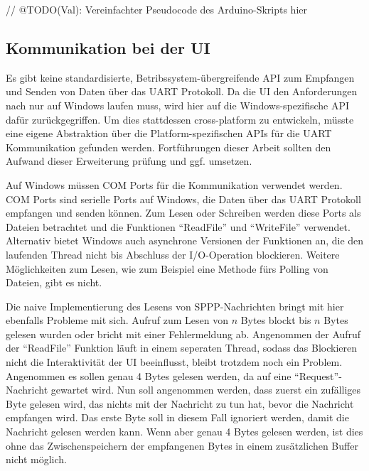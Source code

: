 \begin{UnbrokenCodePage}[style=CStyle, caption={Kommunikation beim \ac{MC}}, label={code:Comm-MC}]
// @TODO(Val): Vereinfachter Pseudocode des Arduino-Skripts hier
\end{UnbrokenCodePage}


\subsection{Kommunikation bei der \ac{UI}} \label{umsetzungSW-Kommunikation-UI}

Es gibt keine standardisierte, Betribssystem-übergreifende API zum Empfangen und Senden von Daten über das \ac{UART} Protokoll.
Da die \ac{UI} den Anforderungen nach nur auf Windows laufen muss, wird hier auf die Windows-spezifische API dafür zurückgegriffen.
Um dies stattdessen cross-platform zu entwickeln, müsste eine eigene Abstraktion über die Platform-spezifischen APIs für die \ac{UART} Kommunikation gefunden werden.
Fortführungen dieser Arbeit sollten den Aufwand dieser Erweiterung prüfung und ggf. umsetzen.

Auf Windows müssen COM Ports für die Kommunikation verwendet werden.
COM Ports sind serielle Ports auf Windows, die Daten über das \ac{UART} Protokoll empfangen und senden können.
Zum Lesen oder Schreiben werden diese Ports als Dateien betrachtet und die Funktionen \enquote{ReadFile} und \enquote{WriteFile} verwendet.
Alternativ bietet Windows auch asynchrone Versionen der Funktionen an, die den laufenden Thread nicht bis Abschluss der \ac{I/O}-Operation blockieren.
Weitere Möglichkeiten zum Lesen, wie zum Beispiel eine Methode fürs Polling von Dateien, gibt es nicht. %

Die naive Implementierung des Lesens von \ac{SPPP}-Nachrichten bringt mit hier ebenfalls Probleme mit sich.
Aufruf zum Lesen von $n$ Bytes blockt bis $n$ Bytes gelesen wurden oder bricht mit einer Fehlermeldung ab.
Angenommen der Aufruf der \enquote{ReadFile} Funktion läuft in einem seperaten Thread, sodass das Blockieren nicht die Interaktivität der \ac{UI} beeinflusst, bleibt trotzdem noch ein Problem.
Angenommen es sollen genau 4 Bytes gelesen werden, da auf eine \enquote{Request}-Nachricht gewartet wird.
Nun soll angenommen werden, dass zuerst ein zufälliges Byte gelesen wird, das nichts mit der Nachricht zu tun hat, bevor die Nachricht empfangen wird.
Das erste Byte soll in diesem Fall ignoriert werden, damit die Nachricht gelesen werden kann.
Wenn aber genau 4 Bytes gelesen werden, ist dies ohne das Zwischenspeichern der empfangenen Bytes in einem zusätzlichen Buffer nicht möglich.

